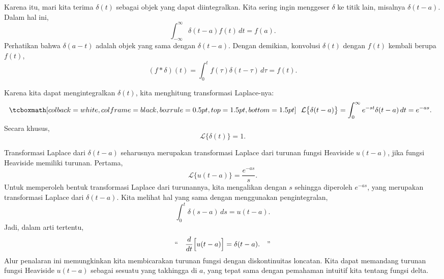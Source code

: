 Karena itu, mari kita terima $\delta(t)$ sebagai objek yang dapat
diintegralkan.  Kita sering ingin menggeser $\delta$ ke titik lain, misalnya
$\delta(t-a)$.  Dalam hal ini,
\begin{equation*}
\int_{-\infty}^\infty \delta(t-a) f(t) \,dt = f(a) .
\end{equation*}
Perhatikan bahwa $\delta(a-t)$ adalah objek yang sama dengan $\delta(t-a)$.
Dengan demikian, konvolusi $\delta(t)$ dengan $f(t)$ kembali berupa $f(t)$,
\begin{equation*}
(f * \delta) (t) = 
\int_{0}^t f(\tau) \delta(t-\tau) \,d\tau
= f(t) .
\end{equation*}

Karena kita dapat mengintegralkan $\delta(t)$, kita menghitung transformasi Laplace-nya:
\begin{equation*}
\mybxbg{~~
{\mathcal{L}} \bigl\{ \delta(t-a) \bigr\}
=
\int_{0}^\infty e^{-st} \delta(t-a) \,dt = e^{-as} .
~~}
\end{equation*}
Secara khusus,
\begin{equation*}
{\mathcal{L}} \bigl\{ \delta(t) \bigr\} = 1 .
\end{equation*}

\begin{remark} \label{remark:deltaderivofjump}
Transformasi Laplace dari $\delta(t-a)$ seharusnya 
merupakan transformasi Laplace dari turunan fungsi Heaviside
$u(t-a)$, jika fungsi Heaviside memiliki turunan.
Pertama,
\begin{equation*}
{\mathcal{L}} \bigl\{ u(t-a) \bigr\} = \frac{e^{-as}}{s}.
\end{equation*}
Untuk memperoleh bentuk transformasi Laplace dari turunannya,
kita mengalikan dengan $s$ sehingga diperoleh $e^{-as}$, yang merupakan transformasi Laplace
dari $\delta(t-a)$.
Kita melihat hal yang sama dengan menggunakan pengintegralan,
\begin{equation*}
\int_0^t \delta(s-a)\,ds = u(t-a) .
\end{equation*}
Jadi, dalam arti tertentu,
\begin{equation*}
\text{``}
\quad \frac{d}{dt} \Bigl[ u(t-a) \Bigr] = \delta(t-a) . \quad
\text{''}
\end{equation*}
Alur penalaran ini memungkinkan kita membicarakan turunan fungsi dengan
diskontinuitas loncatan.
Kita dapat memandang
turunan fungsi Heaviside $u(t-a)$ sebagai sesuatu yang takhingga
di $a$, yang tepat sama dengan pemahaman intuitif kita tentang fungsi
delta.
\end{remark}

